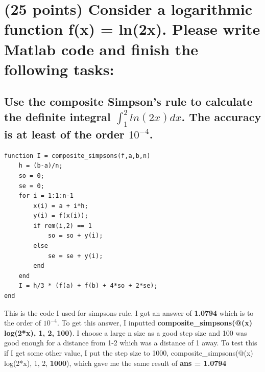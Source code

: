 \documentclass[12pt,letterpaper]{article}
\begin{document}
\section{(25 points) Consider a logarithmic function f(x) = ln(2x). Please write Matlab code and
finish the following tasks:}
\subsection{Use the composite Simpson’s rule to calculate the definite integral \boldmath$\int_{1}^{2}ln(2x)dx$. The accuracy is at least of the order $10^{-4}$.}
\begin{lstlisting}
function I = composite_simpsons(f,a,b,n)
    h = (b-a)/n;
    so = 0;
    se = 0;
    for i = 1:1:n-1
        x(i) = a + i*h;
        y(i) = f(x(i));
        if rem(i,2) == 1
            so = so + y(i);
        else
            se = se + y(i);
        end
    end
    I = h/3 * (f(a) + f(b) + 4*so + 2*se);
end
\end{lstlisting}
This is the code I used for simpsons rule. I got an answer of \textbf{1.0794} which is to the order of $10^{-4}$. To get this answer, I inputted
\textbf{composite\_simpsons(@(x) log(2*x), 1, 2, 100)}. I choose a large n size as a good step size and 100 was good enough for a distance from 1-2 which was a distance of 1 away.
To test this if I get some other value, I put the step size to 1000, composite\_simpsons(@(x) log(2*x), 1, 2, \textbf{1000}), which gave me the same result of \textbf{ans = 1.0794}
\end{document}
